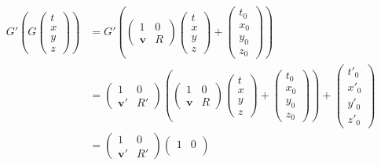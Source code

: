 \begin{align*}
  G'\left(G
  \begin{pmatrix}
    t\\x\\y\\z
  \end{pmatrix}\right)&=G'\left(
    \begin{pmatrix}
      1 & 0 \\
      \mathbf{v} & R
    \end{pmatrix}
    \begin{pmatrix}
      t\\x\\y\\z
    \end{pmatrix}
    +
    \begin{pmatrix}
      t_0\\x_0\\y_0\\z_0
    \end{pmatrix}
  \right)\\
  &=
  \begin{pmatrix}
    1 & 0 \\
    \mathbf{v}' & R'
  \end{pmatrix}\left(
    \begin{pmatrix}
      1 & 0 \\
      \mathbf{v} & R
    \end{pmatrix}
    \begin{pmatrix}
      t\\x\\y\\z
    \end{pmatrix}
    +
    \begin{pmatrix}
      t_0\\x_0\\y_0\\z_0
    \end{pmatrix}
  \right)
  +
  \begin{pmatrix}
    t'_0\\x'_0\\y'_0\\z'_0
  \end{pmatrix}\\
  &=
  \begin{pmatrix}
    1 & 0 \\
    \mathbf{v}' & R'
  \end{pmatrix}
  \begin{pmatrix}
    1 & 0 \\

\end{pmatrix}
\end{align*}
